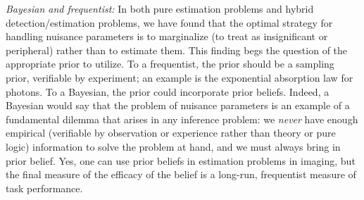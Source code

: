 \noindent
\textit{Bayesian and frequentist:}
In both pure estimation problems and hybrid detection/estimation problems, we have found that the optimal strategy for handling nuisance parameters is to marginalize (to treat as insignificant or peripheral) rather than to estimate them.  This finding begs the question of the appropriate prior to utilize.  To a frequentist, the prior should be a sampling prior, verifiable by experiment; an example is the exponential absorption law for photons.  To a Bayesian, the prior could incorporate prior beliefs.  Indeed, a Bayesian would say that the problem of nuisance parameters is an example of a fundamental dilemma that arises in any inference problem: we \textit{never} have enough empirical (verifiable by observation or experience rather than theory or pure logic) information to solve the problem at hand, and we must always bring in prior belief.  
Yes, one can use prior beliefs in estimation problems in imaging, but the final measure of the efficacy of the belief is a long-run, frequentist measure of task performance.